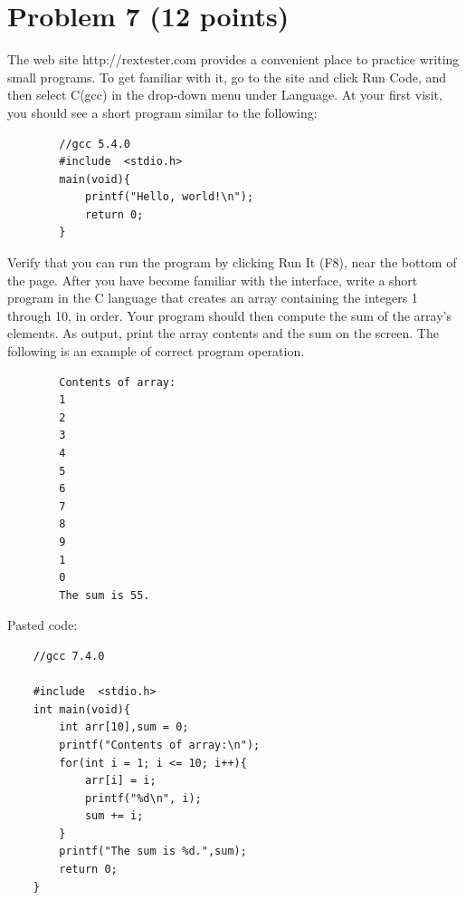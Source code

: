 \documentclass{article}
\begin{document}
\section*{Problem 7 (12 points)}
The  web  site http://rextester.com  provides  a  convenient  place  to  practice  writing  small programs. To get familiar with it, go to the site and click Run Code, and then select C(gcc) in the drop-down menu under Language. At your first visit, you should see a short program similar to the following:
\lstset{language=C}
\lstset{frame=lines}
\lstset{basicstyle=\footnotesize}
\begin{lstlisting}
        //gcc 5.4.0
        #include  <stdio.h>
        main(void){    
            printf("Hello, world!\n");    
            return 0;
        }
\end{lstlisting}
Verify that you can run the program by clicking Run It (F8), near the bottom of the page. After you have become familiar with the interface, write a short program in the C language that creates an array containing the integers 1 through 10, in order. Your program should then compute the sum of the array’s elements. As output, print the array contents and the sum on the screen.  The following is an example of correct program operation.
\begin{lstlisting}
        Contents of array:
        1
        2
        3
        4
        5
        6
        7
        8
        9
        1
        0
        The sum is 55.
\end{lstlisting}
\begin{center}
Pasted code:
\end{center}
\begin{lstlisting}
    //gcc 7.4.0
    
    #include  <stdio.h>
    int main(void){
        int arr[10],sum = 0;
        printf("Contents of array:\n");
        for(int i = 1; i <= 10; i++){ 
            arr[i] = i;
            printf("%d\n", i);
            sum += i;
        }
        printf("The sum is %d.",sum);
        return 0;
    }
\end{lstlisting}
\newpage
\end{document}
